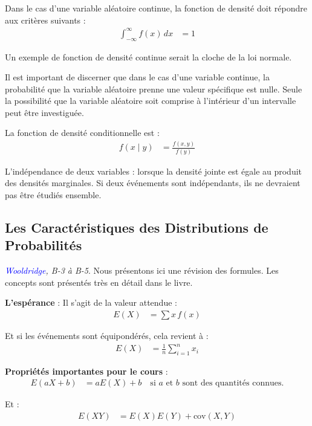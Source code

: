 \documentclass[14pt]{extarticle} %
\newcommand{\livre}[1]{\textcolor{blue}{#1}}
\begin{document}
Dans le cas d’une variable aléatoire continue, la fonction de densité doit répondre aux critères 
suivants :
\begin{align*}
    \int_{-\infty}^{\infty} f(x) \, dx &= 1
\end{align*}

Un exemple de fonction de densité continue serait la cloche de la loi normale.

Il est important de discerner que dans le cas d’une variable continue, la probabilité que la variable 
aléatoire prenne une valeur spécifique est nulle. Seule la possibilité que la variable aléatoire soit 
comprise à l’intérieur d’un intervalle peut être investiguée.

La fonction de densité conditionnelle est :
\begin{align*}
    f(x \mid y) &= \frac{f(x, y)}{f(y)}
\end{align*}

L’indépendance de deux variables : lorsque la densité jointe est égale au produit des densités marginales. 
Si deux événements sont indépendants, ils ne devraient pas être étudiés ensemble.

\subsection{Les Caractéristiques des Distributions de Probabilités}

\textit{\livre{Wooldridge}, B-3 à B-5}. Nous présentons ici une révision des formules. Les concepts 
sont présentés très en détail dans le livre.

\textbf{L’espérance} : Il s’agit de la valeur attendue :
\begin{align*}
    E(X) &= \sum x \, f(x)
\end{align*}

Et si les événements sont équipondérés, cela revient à :
\begin{align*}
    E(X) &= \frac{1}{n} \sum_{i=1}^{n} x_i
\end{align*}

\textbf{Propriétés importantes pour le cours} :
\begin{align*}
    E(aX + b) &= aE(X) + b \quad \text{si } a \text{ et } b \text{ sont des quantités connues.}
\end{align*}

Et :
\begin{align*}
    E(XY) &= E(X)E(Y) + \text{cov}(X, Y)
\end{align*}
\end{document}
